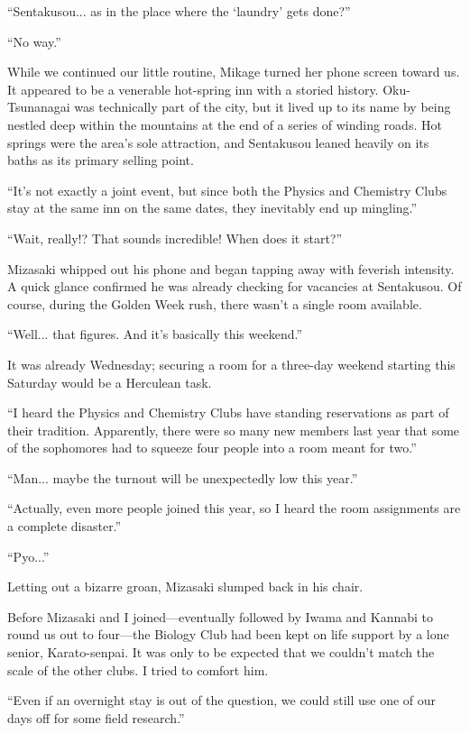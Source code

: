 \documentclass[
    a4paper,
    12pt,
    twoside,
    openany,
    UTF8,
    fontset=windows
]{ctexbook}
\begin{document}
``Sentakusou... as in the place where the `laundry' gets done?''

``No way.''

While we continued our little routine, Mikage turned her phone screen toward us. It appeared to be a venerable hot-spring inn with a storied history. Oku-Tsunanagai was technically part of the city, but it lived up to its name by being nestled deep within the mountains at the end of a series of winding roads. Hot springs were the area's sole attraction, and Sentakusou leaned heavily on its baths as its primary selling point.

``It's not exactly a joint event, but since both the Physics and Chemistry Clubs stay at the same inn on the same dates, they inevitably end up mingling.''

``Wait, really!? That sounds incredible! When does it start?''

Mizasaki whipped out his phone and began tapping away with feverish intensity. A quick glance confirmed he was already checking for vacancies at Sentakusou. Of course, during the Golden Week rush, there wasn't a single room available.

``Well... that figures. And it's basically this weekend.''

It was already Wednesday; securing a room for a three-day weekend starting this Saturday would be a Herculean task.

``I heard the Physics and Chemistry Clubs have standing reservations as part of their tradition. Apparently, there were so many new members last year that some of the sophomores had to squeeze four people into a room meant for two.''

``Man... maybe the turnout will be unexpectedly low this year.''

``Actually, even more people joined this year, so I heard the room assignments are a complete disaster.''

``Pyo...''

Letting out a bizarre groan, Mizasaki slumped back in his chair.

Before Mizasaki and I joined---eventually followed by Iwama and Kannabi to round us out to four---the Biology Club had been kept on life support by a lone senior, Karato-senpai. It was only to be expected that we couldn't match the scale of the other clubs. I tried to comfort him.

``Even if an overnight stay is out of the question, we could still use one of our days off for some field research.''
\end{document}
